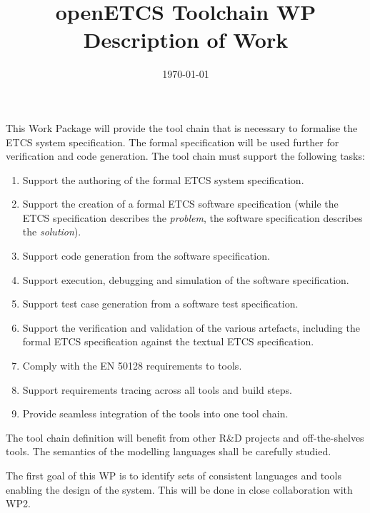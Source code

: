 \documentclass[11pt, a4paper]{article}
\title{openETCS Toolchain WP Description of Work}
\date{\today}
\begin{document}
\maketitle
\tableofcontents

\vspace{0.5cm}

This Work Package will provide the tool chain that is necessary to formalise the ETCS system specification.  The formal specification will be used further for verification and code generation.  The tool chain must support the following tasks:

\begin{enumerate}
\item Support the authoring of the formal ETCS system specification.

\item Support the creation of a formal ETCS software specification (while the ETCS specification describes the \emph{problem}, the software specification describes the \emph{solution}).

\item Support code generation from the software specification.

\item Support execution, debugging and simulation of the software specification.

\item Support test case generation from a software test specification.

\item Support the verification and validation of the various artefacts, including the formal ETCS specification against the textual ETCS specification.

\item Comply with the EN 50128 requirements to tools.

\item Support requirements tracing across all tools and build steps. 

\item Provide seamless integration of the tools into one tool chain. 
 
\end{enumerate}

The tool chain definition will benefit from other R\&D projects and off-the-shelves tools. The semantics of the modelling languages shall be carefully studied.

The first goal of this WP is to identify sets of consistent languages and tools enabling the design of the system.  This will be done in close collaboration with WP2.
\end{document}

